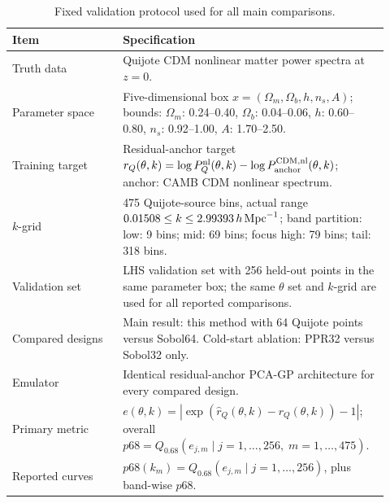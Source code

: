 \begin{table}[t]
\centering
\small
\caption{Fixed validation protocol used for all main comparisons.}
\label{tab:validation_protocol}
\begin{tabular}{p{0.29\linewidth}p{0.63\linewidth}}
\toprule
Item & Specification \\
\midrule
Truth data & Quijote CDM nonlinear matter power spectra at \(z=0\). \\
Parameter space & Five-dimensional box \(x=(\Omega_m,\Omega_b,h,n_s,A)\); bounds: $\Omega_m$: 0.24--0.40, $\Omega_b$: 0.04--0.06, $h$: 0.60--0.80, $n_s$: 0.92--1.00, $A$: 1.70--2.50. \\
Training target & Residual-anchor target \(r_Q(\theta,k)=\log P_Q^{\rm nl}(\theta,k)-\log P_{\rm anchor}^{\rm CDM,nl}(\theta,k)\); anchor: CAMB CDM nonlinear spectrum. \\
\(k\)-grid & 475 Quijote-source bins, actual range \(0.01508\le k\le 2.99393\,h\,{\rm Mpc}^{-1}\); band partition: low: 9 bins; mid: 69 bins; focus high: 79 bins; tail: 318 bins. \\
Validation set & LHS validation set with 256 held-out points in the same parameter box; the same \(\theta\) set and \(k\)-grid are used for all reported comparisons. \\
Compared designs & Main result: this method with 64 Quijote points versus Sobol64. Cold-start ablation: PPR32 versus Sobol32 only. \\
Emulator & Identical residual-anchor PCA-GP architecture for every compared design. \\
Primary metric & \(e(\theta,k)=|\exp(\widehat r_Q(\theta,k)-r_Q(\theta,k))-1|\); overall \(p68=Q_{0.68}(e_{j,m}\mid j=1,\ldots,256,\;m=1,\ldots,475)\). \\
Reported curves & \(p68(k_m)=Q_{0.68}(e_{j,m}\mid j=1,\ldots,256)\), plus band-wise \(p68\). \\
\bottomrule
\end{tabular}
\end{table}
